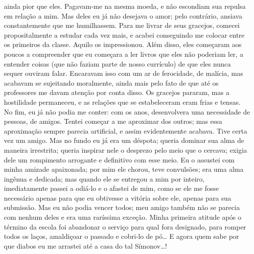 ainda pior que eles. Pagavam-me na mesma moeda, e não escondiam sua
repulsa em relação a mim. Mas deles eu já não desejava o amor; pelo
contrário, ansiava constantemente que me humilhassem. Para me livrar de
seus gracejos, comecei propositalmente a estudar cada vez mais, e
acabei conseguindo me colocar entre os primeiros da classe. Aquilo os
impressionou. Além disso, eles começaram aos poucos a compreender que
eu começara a ler livros que eles não poderiam ler, a entender coisas
(que não faziam parte de nosso currículo) de que eles nunca sequer
ouviram falar. Encaravam isso com um ar de ferocidade, de malícia, mas
acabavam se sujeitando moralmente, ainda mais pelo fato de que até os
professores me davam atenção por conta disso. Os gracejos pararam, mas
a hostilidade permaneceu, e as relações que se estabeleceram eram frias
e tensas. No fim, eu já não podia me conter: com os anos, desenvolvera
uma necessidade de pessoas, de amigos. Tentei começar a me aproximar
dos outros; mas essa aproximação sempre parecia artificial, e assim
evidentemente acabava. Tive certa vez um amigo. Mas no fundo eu já era
um déspota; queria dominar sua alma de maneira irrestrita; queria
inspirar nele o desprezo pelo meio que o cercava; exigia dele um
rompimento arrogante e definitivo com esse meio. Eu o assustei com
minha amizade apaixonada; por mim ele chorou, teve convulsões; era uma
alma ingênua e dedicada; mas quando ele se entregou a mim por inteiro,
imediatamente passei a odiá-lo e o afastei de mim, como se ele me fosse
necessário apenas para que eu obtivesse a vitória sobre ele, apenas
para sua submissão. Mas eu não podia vencer todos; meu amigo também não
se parecia com nenhum deles e era uma raríssima exceção. Minha primeira
atitude após o término da escola foi abandonar o serviço para qual fora
designado, para romper todos os laços, amaldiçoar o passado e cobri-lo
de pó\ldots{} E agora quem sabe por que diabos eu me arrastei até a casa do
tal Símonov\ldots{}!

